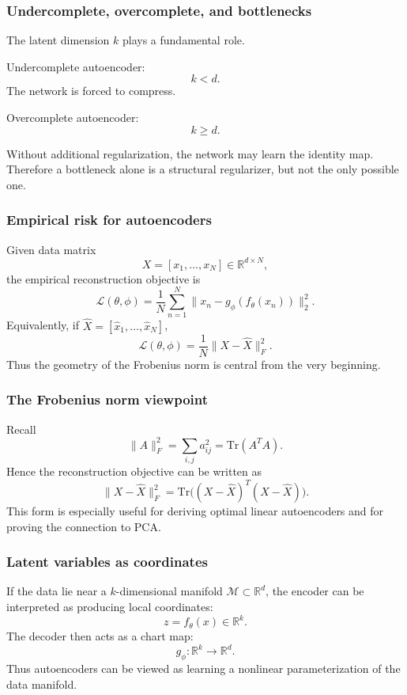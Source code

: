\documentclass{beamer}
\begin{document}
\begin{frame}
\frametitle{Undercomplete, overcomplete, and bottlenecks}

The latent dimension \(k\) plays a fundamental role.

\begin{block}{Undercomplete autoencoder: }
\[
k<d.
\]
The network is forced to compress.
\end{block}
\begin{block}{Overcomplete autoencoder: }
\[
k\ge d.
\]
\end{block}
Without additional regularization, the network may learn the identity map.
Therefore a bottleneck alone is a structural regularizer, but not the only possible one.
\end{frame}

\begin{frame}
\frametitle{Empirical risk for autoencoders}

Given data matrix
\[
X = [x_1,\dots,x_N] \in \mathbb{R}^{d\times N},
\]
the empirical reconstruction objective is
\[
\mathcal{L}(\theta,\phi)
=
\frac{1}{N}\sum_{n=1}^N \|x_n-g_\phi(f_\theta(x_n))\|_2^2.
\]
Equivalently, if \(\hat X=[\hat x_1,\dots,\hat x_N]\),
\[
\mathcal{L}(\theta,\phi)=\frac{1}{N}\|X-\hat X\|_F^2.
\]
Thus the geometry of the Frobenius norm is central from the very beginning.
\end{frame}

\begin{frame}
\frametitle{The Frobenius norm viewpoint}

Recall
\[
\|A\|_F^2 = \sum_{i,j} a_{ij}^2 = \mathrm{Tr}(A^T A).
\]
Hence the reconstruction objective can be written as
\[
\|X-\hat X\|_F^2
=
\mathrm{Tr}\bigl((X-\hat X)^T(X-\hat X)\bigr).
\]
This form is especially useful for deriving optimal linear autoencoders and for proving the connection to PCA.
\end{frame}

\begin{frame}
\frametitle{Latent variables as coordinates}

If the data lie near a \(k\)-dimensional manifold \(\mathcal{M}\subset\mathbb{R}^d\), the encoder can be interpreted as producing local coordinates:
\[
z=f_\theta(x)\in \mathbb{R}^k.
\]
The decoder then acts as a chart map:
\[
g_\phi: \mathbb{R}^k \to \mathbb{R}^d.
\]
Thus autoencoders can be viewed as learning a nonlinear parameterization of the data manifold.
\end{frame}
\end{document}
